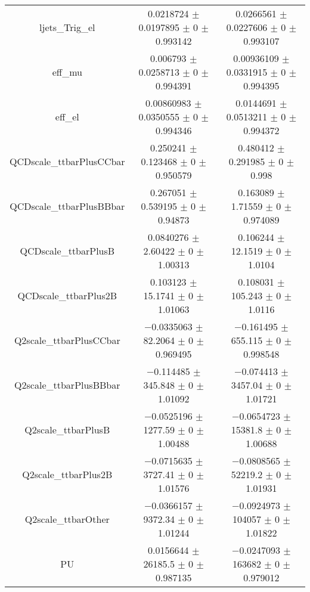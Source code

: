 \begin{table}
\begin{tabular}{ccc}
ljets\_Trig\_el & \num{0.0218724} $\pm$ \num{0.0197895} $\pm$ \num{0} $\pm$ \num{0.993142} & \num{0.0266561} $\pm$ \num{0.0227606} $\pm$ \num{0} $\pm$ \num{0.993107}\\
eff\_mu & \num{0.006793} $\pm$ \num{0.0258713} $\pm$ \num{0} $\pm$ \num{0.994391} & \num{0.00936109} $\pm$ \num{0.0331915} $\pm$ \num{0} $\pm$ \num{0.994395}\\
eff\_el & \num{0.00860983} $\pm$ \num{0.0350555} $\pm$ \num{0} $\pm$ \num{0.994346} & \num{0.0144691} $\pm$ \num{0.0513211} $\pm$ \num{0} $\pm$ \num{0.994372}\\
QCDscale\_ttbarPlusCCbar & \num{0.250241} $\pm$ \num{0.123468} $\pm$ \num{0} $\pm$ \num{0.950579} & \num{0.480412} $\pm$ \num{0.291985} $\pm$ \num{0} $\pm$ \num{0.998}\\
QCDscale\_ttbarPlusBBbar & \num{0.267051} $\pm$ \num{0.539195} $\pm$ \num{0} $\pm$ \num{0.94873} & \num{0.163089} $\pm$ \num{1.71559} $\pm$ \num{0} $\pm$ \num{0.974089}\\
QCDscale\_ttbarPlusB & \num{0.0840276} $\pm$ \num{2.60422} $\pm$ \num{0} $\pm$ \num{1.00313} & \num{0.106244} $\pm$ \num{12.1519} $\pm$ \num{0} $\pm$ \num{1.0104}\\
QCDscale\_ttbarPlus2B & \num{0.103123} $\pm$ \num{15.1741} $\pm$ \num{0} $\pm$ \num{1.01063} & \num{0.108031} $\pm$ \num{105.243} $\pm$ \num{0} $\pm$ \num{1.0116}\\
Q2scale\_ttbarPlusCCbar & \num{-0.0335063} $\pm$ \num{82.2064} $\pm$ \num{0} $\pm$ \num{0.969495} & \num{-0.161495} $\pm$ \num{655.115} $\pm$ \num{0} $\pm$ \num{0.998548}\\
Q2scale\_ttbarPlusBBbar & \num{-0.114485} $\pm$ \num{345.848} $\pm$ \num{0} $\pm$ \num{1.01092} & \num{-0.074413} $\pm$ \num{3457.04} $\pm$ \num{0} $\pm$ \num{1.01721}\\
Q2scale\_ttbarPlusB & \num{-0.0525196} $\pm$ \num{1277.59} $\pm$ \num{0} $\pm$ \num{1.00488} & \num{-0.0654723} $\pm$ \num{15381.8} $\pm$ \num{0} $\pm$ \num{1.00688}\\
Q2scale\_ttbarPlus2B & \num{-0.0715635} $\pm$ \num{3727.41} $\pm$ \num{0} $\pm$ \num{1.01576} & \num{-0.0808565} $\pm$ \num{52219.2} $\pm$ \num{0} $\pm$ \num{1.01931}\\
Q2scale\_ttbarOther & \num{-0.0366157} $\pm$ \num{9372.34} $\pm$ \num{0} $\pm$ \num{1.01244} & \num{-0.0924973} $\pm$ \num{104057} $\pm$ \num{0} $\pm$ \num{1.01822}\\
PU & \num{0.0156644} $\pm$ \num{26185.5} $\pm$ \num{0} $\pm$ \num{0.987135} & \num{-0.0247093} $\pm$ \num{163682} $\pm$ \num{0} $\pm$ \num{0.979012}\\

\end{tabular}
\end{table}
